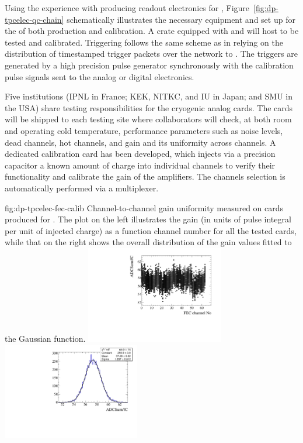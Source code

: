 Using the experience with producing  readout electronics for , Figure~\ref{fig:dp-tpcelec-qc-chain} schematically illustrates the necessary equipment and set up for the  of both production and calibration. A  crate equipped with  and  will host  to be tested and calibrated. Triggering follows the same scheme as in  relying on the distribution of timestamped trigger packets over the  network to . The triggers are generated by a high precision pulse generator synchronously with the calibration pulse signals sent to the analog or digital electronics.  

Five institutions (IPNL in France; KEK, NITKC, and IU in Japan; and SMU in the USA) share testing responsibilities for the cryogenic  analog cards. The cards will be shipped to each testing site where collaborators will check, at both room and operating cold temperature, performance parameters such as noise levels, dead channels, hot channels, and gain and its uniformity across channels. A dedicated calibration card has been developed, which injects via a precision capacitor a known amount of charge into individual  channels to verify their functionality and calibrate the gain of the amplifiers. The channels selection is automatically performed via a multiplexer.

\begin{dunefigure}{fig:dp-tpcelec-fec-calib}
{Channel-to-channel gain uniformity measured on  cards produced for . The plot on the left illustrates the gain (in units of pulse integral per unit of injected charge) as a function channel number for all the tested cards, while that on the right shows the overall distribution of the gain values fitted to the Gaussian function.}
\includegraphics[width=0.45\textwidth]{graphics/dp-tpcelec-fec-calib-chnum}
\includegraphics[width=0.45\textwidth]{graphics/dp-tpcelec-fec-calib-adcsum}
\end{dunefigure}


